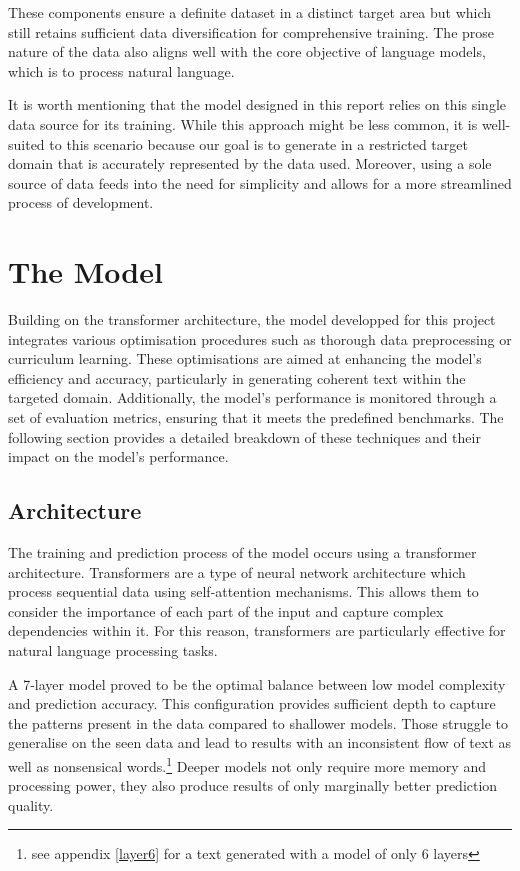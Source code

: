 \documentclass[11pt]{article}
\begin{document}
    These components ensure a definite dataset in a distinct target area but which still retains sufficient data diversification for comprehensive training.
    The prose nature of the data also aligns well with the core objective of language models, which is to process natural language.

    It is worth mentioning that the model designed in this report relies on this single data source for its training.
    While this approach might be less common, it is well-suited to this scenario because our goal is to generate in a restricted target domain that is accurately represented by the data used.
    Moreover, using a sole source of data feeds into the need
    for simplicity and allows for a more streamlined process of development.

    \section{The Model}
    Building on the transformer architecture, the model developped for this project integrates various optimisation procedures such as thorough data preprocessing or curriculum learning.
    These optimisations are aimed at enhancing the model’s efficiency and accuracy, particularly in generating coherent text within the targeted domain. Additionally, the model's performance is monitored through a set of evaluation metrics, ensuring that it meets the predefined benchmarks. The following section provides a detailed breakdown of these techniques and their impact on the model's performance.

    \subsection*{Architecture}
    The training and prediction process of the model occurs using a transformer architecture.
    Transformers are a type of neural network architecture which process sequential data using self-attention mechanisms.
    This allows them to consider the importance of each part of the input and capture complex dependencies within it.
    For this reason, transformers are particularly effective for natural language processing tasks.

    A 7-layer model proved to be the optimal balance between low model complexity and prediction accuracy.
    This configuration provides sufficient depth to capture the patterns present in the data compared to shallower models. Those struggle to generalise on the seen data
    and lead to results with an inconsistent flow of text as well as nonsensical words.\footnote{see appendix \ref{layer6} for a text generated with a model of only 6 layers}
    Deeper models not only require more memory and processing power, they also produce results of only marginally better prediction quality.
\end{document}
